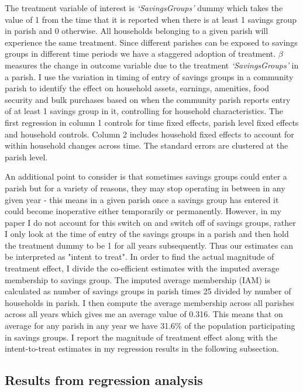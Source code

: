 \documentclass[12pt]{article}
\begin{document}
{\hspace{1cm} The treatment variable of interest is \textit{`SavingsGroups'} dummy which takes the value of 1 from the time that it is reported when there is at least 1 savings group in parish and 0 otherwise. All households belonging to a given parish will experience the same treatment. Since different parishes can be exposed to savings groups in different time periods we have a staggered adoption of treatment. $\beta$ measures the change in outcome variable due to the treatment \textit {`SavingsGroups'} in a parish. I use the variation in timing of entry of savings groups in a community parish to identify the effect on household assets, earnings, amenities, food security and bulk purchases based on when the community parish reports entry of at least 1 savings group in it, controlling for household characteristics. The first regression in column 1 controls for time fixed effects, parish level fixed effects and household controls. Column 2 includes household fixed effects to account for within household changes across time. The standard errors are clustered at the parish level. 

\hspace{1cm} An additional point to consider is that sometimes savings groups could enter a parish but for a variety of reasons, they may stop operating in between in any given year - this means in a given parish once a savings group has entered it could become inoperative either temporarily or permanently. However, in my paper I do not account for this switch on and switch off of savings groups, rather I only look at the time of entry of the savings groups in a parish and then hold the treatment dummy to be 1 for all years subsequently. Thus our estimates can be interpreted as "intent to treat". In order to find the actual magnitude of treatment effect, I divide the co-efficient estimates with the imputed average membership to savings group. The imputed average membership (IAM) is calculated as number of savings groups in parish times 25 divided by number of households in parish. I then compute the average membership across all parishes across all years which gives me an average value of 0.316. This means that on average for any parish in any year we have 31.6\% of the population participating in savings groups. I report the magnitude of treatment effect along with the intent-to-treat estimates in my regression results in the following subsection.

\subsection{Results from regression analysis}\label{sec:regression1}

}
\end{document}
